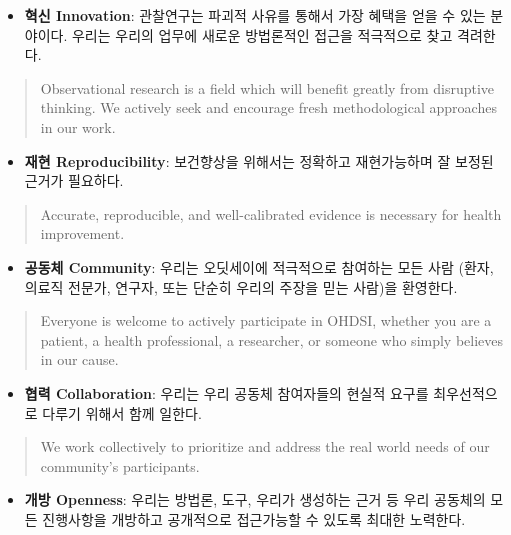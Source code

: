 \documentclass[11pt]{book}
\providecommand{\tightlist}{%
  \setlength{\itemsep}{0pt}\setlength{\parskip}{0pt}}
\theoremstyle{definition}
\theoremstyle{definition}
\theoremstyle{definition}
\theoremstyle{remark}
\begin{document}
\begin{itemize}
\tightlist
\item
  \textbf{혁신 Innovation}: 관찰연구는 파괴적 사유를 통해서 가장 혜택을
  얻을 수 있는 분야이다. 우리는 우리의 업무에 새로운 방법론적인 접근을
  적극적으로 찾고 격려한다.
\end{itemize}

\begin{quote}
Observational research is a field which will benefit greatly from
disruptive thinking. We actively seek and encourage fresh methodological
approaches in our work.
\end{quote}

\begin{itemize}
\tightlist
\item
  \textbf{재현 Reproducibility}: 보건향상을 위해서는 정확하고
  재현가능하며 잘 보정된 근거가 필요하다.
\end{itemize}

\begin{quote}
Accurate, reproducible, and well-calibrated evidence is necessary for
health improvement.
\end{quote}

\begin{itemize}
\tightlist
\item
  \textbf{공동체 Community}: 우리는 오딧세이에 적극적으로 참여하는 모든
  사람 (환자, 의료직 전문가, 연구자, 또는 단순히 우리의 주장을 믿는
  사람)을 환영한다.
\end{itemize}

\begin{quote}
Everyone is welcome to actively participate in OHDSI, whether you are a
patient, a health professional, a researcher, or someone who simply
believes in our cause.
\end{quote}

\begin{itemize}
\tightlist
\item
  \textbf{협력 Collaboration}: 우리는 우리 공동체 참여자들의 현실적
  요구를 최우선적으로 다루기 위해서 함께 일한다.
\end{itemize}

\begin{quote}
We work collectively to prioritize and address the real world needs of
our community's participants.
\end{quote}

\begin{itemize}
\tightlist
\item
  \textbf{개방 Openness}: 우리는 방법론, 도구, 우리가 생성하는 근거 등
  우리 공동체의 모든 진행사항을 개방하고 공개적으로 접근가능할 수 있도록
  최대한 노력한다.
\end{itemize}
\end{document}
